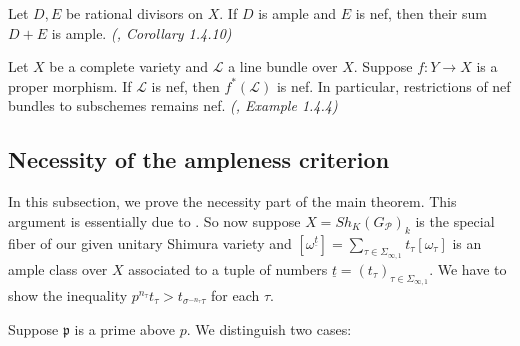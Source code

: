 \documentclass{article}
\begin{document}
\begin{proposition}\label{ampleness}
Let $D,E$ be rational divisors on $X$. If $D$ is ample and $E$ is nef, then their sum $D+E$ is ample. \emph{(\citep{Lazarsfeld}, Corollary 1.4.10)}
\end{proposition}

\begin{proposition}\label{pullback}
Let $X$ be a complete variety and $\mathcal{L}$ a line bundle over $X$. Suppose $f:Y\to X$ is a proper morphism. If $\mathcal{L}$ is nef, then $f^\ast(\mathcal{L})$ is nef. In particular, restrictions of nef bundles to subschemes remains nef. \emph{(\citep{Lazarsfeld}, Example 1.4.4)}
\end{proposition}






\subsection{Necessity of the ampleness criterion}

In this subsection, we prove the necessity part of the main theorem. This argument is essentially due to \citep[\S6]{Tian-Xiao}. So now suppose $X=Sh_K(G_\mathcal{P})_k$ is the special fiber of our given unitary Shimura variety and $[\omega^{\underline{t}}]=\sum_{\tau\in\Sigma_{\infty,1}}t_\tau[\omega_\tau]$ is an ample class over $X$
associated to a tuple of numbers $\underline{t}=(t_\tau)_{\tau\in \Sigma_{\infty,1}}$. We have to show the inequality $p^{n_\tau}t_\tau>t_{\sigma^{-n_\tau}\tau}$ for each $\tau$.

Suppose $\mathfrak{p}$ is a prime above $p$. We distinguish two cases:
\end{document}
